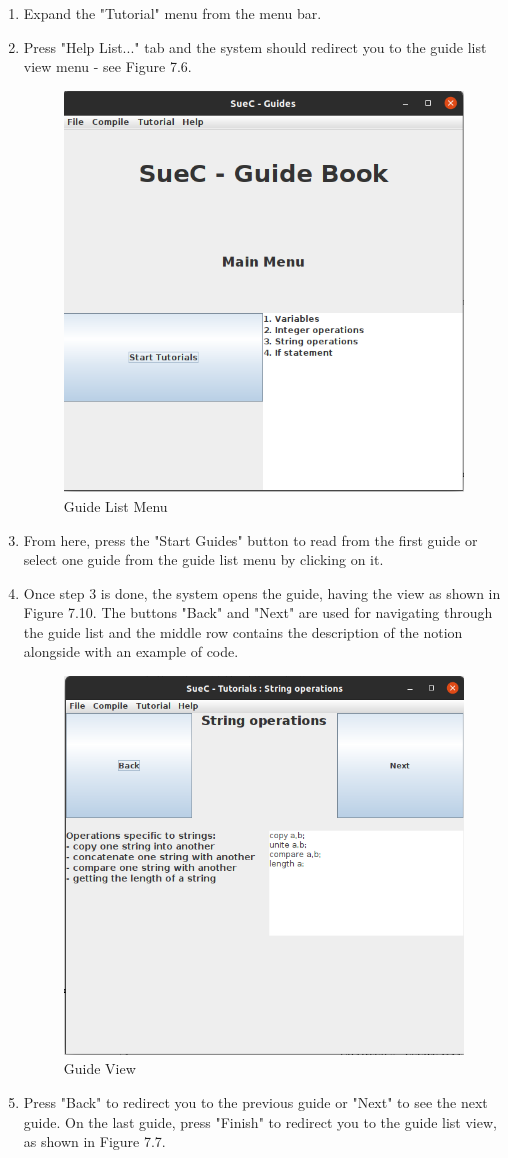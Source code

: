 \documentclass[12pt,a4paper,twoside]{report}
\begin{document}
\begin{enumerate}
\item Expand the "Tutorial" menu from the menu bar.
\item Press "Help List..." tab and the system should redirect you to the guide list view menu - see Figure 7.6.

\begin{figure}[H]
    \centering
    \includegraphics[width=0.55\linewidth]{img/userGuide/GuideListMenu.png}
    \caption{Guide List Menu}
    \label{fig:conf}
\end{figure}

\item From here, press the "Start Guides" button to read from the first guide or select one guide from the guide list menu by clicking on it.

\item Once step 3 is done, the system opens the guide, having the view as shown in Figure 7.10. The buttons "Back" and "Next" are used for navigating through the guide list and the middle row contains the description of the notion alongside with an example of code.

\begin{figure}[H]
    \centering
    \includegraphics[width=0.6\linewidth]{img/userGuide/GuideDialog.png}
    \caption{Guide View}
    \label{fig:conf}
\end{figure}

\item Press "Back" to redirect you to the previous guide or "Next" to see the next guide. On the last guide, press "Finish" to redirect you to the guide list view, as shown in Figure 7.7.
\end{enumerate}
\end{document}
